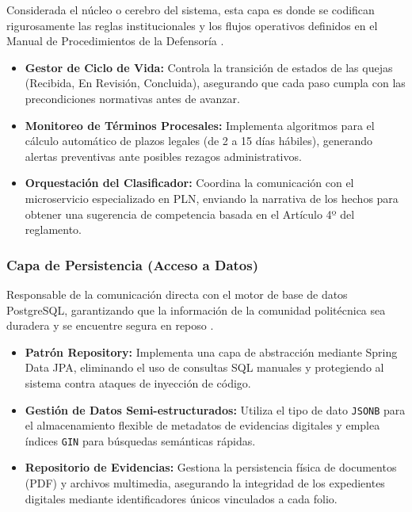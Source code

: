 Considerada el núcleo o cerebro del sistema, esta capa es donde se codifican rigurosamente las reglas institucionales y los flujos operativos definidos en el Manual de Procedimientos de la Defensoría .

\begin{itemize}
    \item \textbf{Gestor de Ciclo de Vida:} Controla la transición de estados de las quejas (Recibida, En Revisión, Concluida), asegurando que cada paso cumpla con las precondiciones normativas antes de avanzar.
    \item \textbf{Monitoreo de Términos Procesales:} Implementa algoritmos para el cálculo automático de plazos legales (de 2 a 15 días hábiles), generando alertas preventivas ante posibles rezagos administrativos.
    \item \textbf{Orquestación del Clasificador:} Coordina la comunicación con el microservicio especializado en PLN, enviando la narrativa de los hechos para obtener una sugerencia de competencia basada en el Artículo 4º del reglamento.
\end{itemize}



\subsubsection{Capa de Persistencia (Acceso a Datos)}

Responsable de la comunicación directa con el motor de base de datos PostgreSQL, garantizando que la información de la comunidad politécnica sea duradera y se encuentre segura en reposo .

\begin{itemize}
    \item \textbf{Patrón Repository:} Implementa una capa de abstracción mediante Spring Data JPA, eliminando el uso de consultas SQL manuales y protegiendo al sistema contra ataques de inyección de código.
    \item \textbf{Gestión de Datos Semi-estructurados:} Utiliza el tipo de dato \texttt{JSONB} para el almacenamiento flexible de metadatos de evidencias digitales y emplea índices \texttt{GIN} para búsquedas semánticas rápidas.
    \item \textbf{Repositorio de Evidencias:} Gestiona la persistencia física de documentos (PDF) y archivos multimedia, asegurando la integridad de los expedientes digitales mediante identificadores únicos vinculados a cada folio.
\end{itemize}


